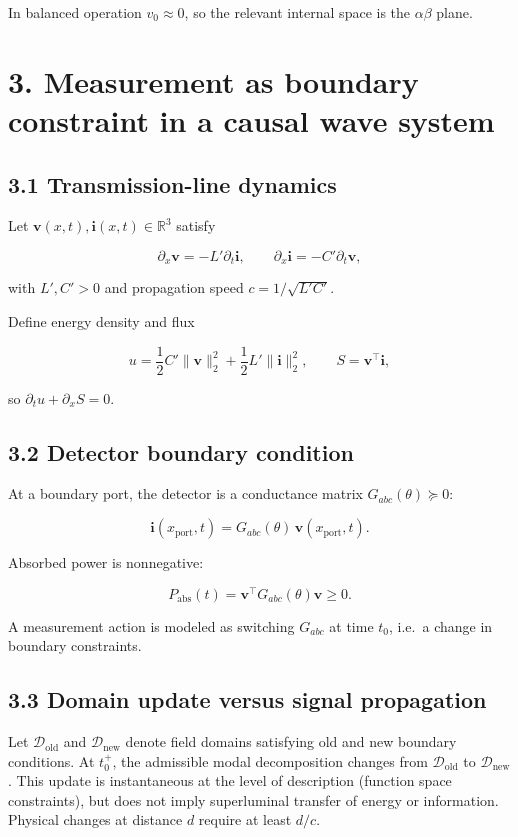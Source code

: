 \documentclass[
  letterpaper,
  DIV=11,
  numbers=noendperiod]{scrartcl}
\begin{document}
In balanced operation \(v_0\approx 0\), so the relevant internal space
is the \(\alpha\beta\) plane.

\section{3. Measurement as boundary constraint in a causal wave
system}\label{measurement-as-boundary-constraint-in-a-causal-wave-system}

\subsection{3.1 Transmission-line
dynamics}\label{transmission-line-dynamics}

Let \(\mathbf v(x,t),\mathbf i(x,t)\in\mathbb R^3\) satisfy

\[
\partial_x\mathbf v = -L'\partial_t\mathbf i,
\qquad
\partial_x\mathbf i = -C'\partial_t\mathbf v,
\]

with \(L',C'>0\) and propagation speed \(c=1/\sqrt{L'C'}\).

Define energy density and flux

\[
u=\frac12 C'\|\mathbf v\|_2^2+\frac12 L'\|\mathbf i\|_2^2,
\qquad
S=\mathbf v^\top\mathbf i,
\]

so \(\partial_t u+\partial_x S=0\).

\subsection{3.2 Detector boundary
condition}\label{detector-boundary-condition}

At a boundary port, the detector is a conductance matrix
\(G_{abc}(\theta)\succeq0\):

\[
\mathbf i(x_{\mathrm{port}},t)=G_{abc}(\theta)\,\mathbf v(x_{\mathrm{port}},t).
\]

Absorbed power is nonnegative:

\[
P_{\mathrm{abs}}(t)=\mathbf v^\top G_{abc}(\theta)\mathbf v\ge 0.
\]

A measurement action is modeled as switching \(G_{abc}\) at time
\(t_0\), i.e.~a change in boundary constraints.

\subsection{3.3 Domain update versus signal
propagation}\label{domain-update-versus-signal-propagation}

Let \(\mathcal D_{\mathrm{old}}\) and \(\mathcal D_{\mathrm{new}}\)
denote field domains satisfying old and new boundary conditions. At
\(t_0^+\), the admissible modal decomposition changes from
\(\mathcal D_{\mathrm{old}}\) to \(\mathcal D_{\mathrm{new}}\). This
update is instantaneous at the level of description (function space
constraints), but does not imply superluminal transfer of energy or
information. Physical changes at distance \(d\) require at least
\(d/c\).
\end{document}
